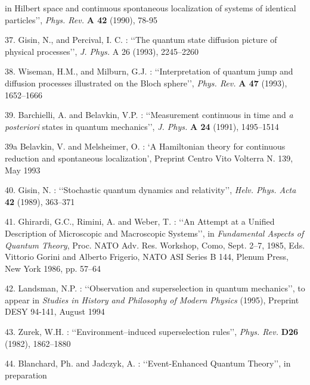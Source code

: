 \documentclass[12pt]{article}
\def\lqq{\lq\lq}
\def\rqq{\rq\rq}
\begin{document}
\begin{description}
in Hilbert space and continuous spontaneous localization of systems of
identical particles\rqq, {\sl Phys. Rev.} {\bf A 42} (1990), 78-95
\item{37.} Gisin, N., and Percival, I. C. : \lqq The quantum state
diffusion picture of physical processes\rqq, {\sl J. Phys.} {A 26}
(1993), 2245--2260
\item{38.} Wiseman, H.M., and Milburn, G.J. : \lqq Interpretation of
quantum jump and diffusion processes illustrated on the Bloch
sphere\rqq, {\sl Phys. Rev. }{\bf A 47} (1993), 1652--1666
\item{39.} Barchielli, A. and Belavkin, V.P. : \lqq Measurement
continuous in time and {\sl a posteriori} states in quantum
mechanics\rqq, {\sl J. Phys.} {\bf A 24} (1991), 1495--1514
\item{39a} Belavkin, V. and Melsheimer, O. : \lq A Hamiltonian
theory for continuous reduction and spontaneous localization\rq,
Preprint Centro Vito Volterra N. 139, May 1993
\item{40.} Gisin, N. : \lqq Stochastic quantum dynamics and relativity\rqq,
{\sl Helv. Phys. Acta} {\bf 42} (1989), 363--371
\item{41.} Ghirardi, G.C., Rimini, A. and Weber, T. : \lqq An Attempt at a
Unified Description of Microscopic and Macroscopic Systems\rqq, in {\sl
Fundamental Aspects of Quantum Theory}, Proc. NATO Adv. Res. Workshop,
Como, Sept. 2--7, 1985, Eds. Vittorio Gorini and Alberto Frigerio, NATO
ASI Series B 144, Plenum Press, New York 1986, pp. 57--64
\item{42.} Landsman, N.P. : \lqq Observation and superselection in quantum
mechanics\rqq, to appear in {\sl Studies in History and Philosophy of
Modern Physics} (1995), Preprint DESY 94-141, August 1994
\item{43.} Zurek, W.H. : \lqq Environment--induced superselection rules\rqq,
{\sl Phys. Rev.} {\bf D26} (1982), 1862--1880
\item{44.} Blanchard, Ph. and Jadczyk, A. : \lqq Event-Enhanced Quantum
Theory\rqq, in preparation
\end{description}
\end{document}
